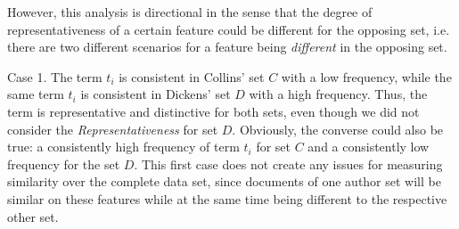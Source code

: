 \documentclass[a4paper,10pt,twoside,fleqn]{article}
\begin{document}
However, this analysis is directional in the sense that the degree
of representativeness of a certain feature could be different
for the opposing set, i.e. there are two different scenarios
for a feature being \emph{different} in the opposing set.

Case 1. The term $t_i$ is consistent in Collins' set $C$ with a low
frequency, while the same term $t_i$ is consistent in Dickens' set $D$
with a high frequency.
Thus, the term is representative and distinctive for both sets,
even though we did not consider the \emph{Representativeness} for set $D$.
Obviously, the converse could also be true: a consistently high frequency
of term $t_i$ for set $C$ and a consistently low frequency for the set $D$.
This first case does not create any issues for measuring similarity over the
complete data set, since documents of one author set will be similar on
these features while at the same time being different to the respective other set.
\end{document}

